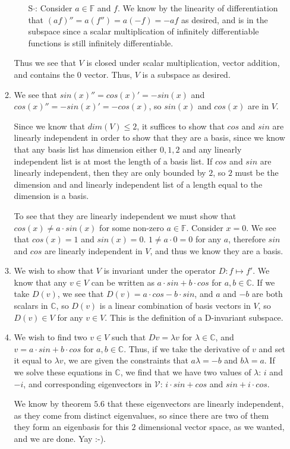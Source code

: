 \documentclass[12pt]{article}
\newcommand{\C}{\mathbb{C}}
\newcommand{\F}{\mathbb{F}}
\newcommand{\V}{\mathcal{V}}
\begin{document}
\begin{enumerate}
\begin{enumerate}
\begin{enumerate}
      \item[S$\cdot$:]
        Consider $a \in \F$ and $f$. We know by the linearity of differentiation that $(af)'' = a(f'') = a(-f) = -af$ as desired, and is in the subspace since a scalar multiplication of infinitely differentiable functions is still infinitely differentiable.
    \end{enumerate}
    
    Thus we see that $V$ is closed under scalar multiplication, vector addition, and contains the $0$ vector. Thus, $V$ is a subspace as desired.

  \item
    We see that $sin(x)'' = cos(x)' = -sin(x)$ and $cos(x)'' = -sin(x)' = -cos(x)$, so $sin(x)$ and $cos(x)$ are in $V$. 
   
    Since we know that $dim(V) \le 2$, it suffices to show that $cos$ and $sin$ are linearly independent in order to show that they are a basis, since we know that any basis list has dimension either $0, 1, 2$ and any linearly independent list is at most the length of a basis list. If $cos$ and $sin$ are linearly independent, then they are only bounded by $2$, so $2$ must be the dimension and and linearly independent list of a length equal to the dimension is a basis.

    To see that they are linearly independent we must show that $cos(x) \ne a \cdot sin(x)$ for some non-zero $a \in \F$. Consider $x = 0$. We see that $cos(x) = 1$ and $sin(x) = 0$. $1 \ne a \cdot 0 = 0$ for any $a$, therefore $sin$ and $cos$ are linearly independent in $V$, and thus we know they are a basis.

  \item
    We wish to show that $V$ is invariant under the operator $D: f \mapsto f'$. We know that any $v \in V$ can be written as $a \cdot sin + b \cdot cos$ for $a, b \in \C$. If we take $D(v)$, we see that $D(v) = a \cdot cos - b \cdot sin$, and $a$ and $-b$ are both scalars in $\C$, so $D(v)$ is a linear combination of basis vectors in $V$, so $D(v) \in V$ for any $v \in V$. This is the definition of a D-invariant subspace.
    
  \item 
    We wish to find two $v \in V$ such that $Dv = \lambda v$ for $\lambda \in \C$, and $v = a \cdot sin + b \cdot cos$ for $a, b \in \C$. Thus, if we take the derivative of $v$ and set it equal to $\lambda v$, we are given the constraints that $a \lambda = -b$ and $b \lambda = a$. If we solve these equations in $\C$, we find that we have two values of $\lambda$: $i$ and $-i$, and corresponding eigenvectors in $\V$: $i\cdot sin + cos$ and $sin + i \cdot cos$.

    We know by theorem $5.6$ that these eigenvectors are linearly independent, as they come from distinct eigenvalues, so since there are two of them they form an eigenbasis for this $2$ dimensional vector space, as we wanted, and we are done. Yay :-).
    
  \end{enumerate}
\end{enumerate}
\end{document}

